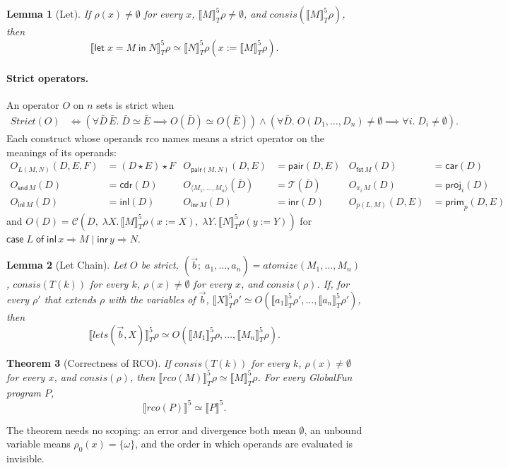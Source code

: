\documentclass[10pt]{article}
\theoremstyle{acmplain}
\newtheorem{theorem}{Theorem}[section]
\newtheorem{lemma}[theorem]{Lemma}
\newcommand{\SEM}[1]{\llbracket #1 \rrbracket}
\newcommand{\key}[1]{\mathsf{#1}}
\newcommand{\pass}[1]{\mathit{#1}}
\newcommand{\Let}{\key{let}\;}
\newcommand{\In}{\;\key{in}\;}
\newcommand{\inl}{\key{inl}\,}
\newcommand{\inr}{\key{inr}\,}
\newcommand{\Case}[5]{\key{case}\;#1\;\key{of}\;\key{inl}\,#2 \Rightarrow #3 \mid \key{inr}\,#4 \Rightarrow #5}
\newcommand{\tuple}[1]{\langle #1 \rangle}
\newcommand{\prj}[1]{\pi_{#1}\,}
\newcommand{\pair}[2]{\key{pair}(#1, #2)}
\newcommand{\FST}{\key{fst}\,}
\newcommand{\SND}{\key{snd}\,}
\newcommand{\prim}[3]{#1(#2, #3)}
\newcommand{\ext}[3]{#1(#2{:=}#3)}
\newcommand{\app}{\star}
\newcommand{\NE}{\neq\emptyset}
\newcommand{\consis}{\mathit{consis}}
\begin{document}
\begin{lemma}[Let]\label{lem:let-beta}
If $\rho(x) \NE$ for every $x$, $\SEM{M}^{\mathrm{5}}_T\rho \NE$, and
$\consis(\SEM{M}^{\mathrm{5}}_T\rho)$, then
\[
  \SEM{\Let x = M \In N}^{\mathrm{5}}_T\rho \simeq
  \SEM{N}^{\mathrm{5}}_T\ext{\rho}{x}{\SEM{M}^{\mathrm{5}}_T\rho} .
\]
\end{lemma}

\paragraph{Strict operators.}
An operator $O$ on $n$ sets is strict when
\begin{align*}
  \mathit{Strict}(O) &\iff
    (\forall \bar{D}\, \bar{E}.\; \bar{D} \simeq \bar{E} \implies O(\bar{D}) \simeq O(\bar{E}))
    \land (\forall \bar{D}.\; O(D_1, \ldots, D_n) \NE \implies \forall i.\; D_i \NE) .
\end{align*}
Each construct whose operands rco names means a strict operator on the
meanings of its operands:
\begin{align*}
  O_{L(M, N)}(D, E, F) &= (D \app E) \app F &
  O_{\pair{M}{N}}(D, E) &= \key{pair}(D, E) &
  O_{\FST M}(D) &= \key{car}(D) \\
  O_{\SND M}(D) &= \key{cdr}(D) &
  O_{\tuple{M_1, \ldots, M_n}}(\bar{D}) &= \mathcal{T}(\bar{D}) &
  O_{\prj{i} M}(D) &= \key{proj}_i(D) \\
  O_{\inl M}(D) &= \key{inl}(D) &
  O_{\inr M}(D) &= \key{inr}(D) &
  O_{\prim{p}{L}{M}}(D, E) &= \key{prim}_p(D, E)
\end{align*}
and $O(D) = \mathcal{C}(D,\; \lambda X.\, \SEM{M}^{\mathrm{5}}_T\ext{\rho}{x}{X},\;
\lambda Y.\, \SEM{N}^{\mathrm{5}}_T\ext{\rho}{y}{Y})$ for
$\Case{L}{x}{M}{y}{N}$.

\begin{lemma}[Let Chain]\label{lem:let-chain}
Let $O$ be strict, $(\vec{b};\; a_1, \ldots, a_n) = \pass{atomize}(M_1, \ldots, M_n)$,
$\consis(T(k))$ for every $k$, $\rho(x) \NE$ for every $x$, and $\consis(\rho)$.
If, for every $\rho'$ that extends
$\rho$ with the variables of $\vec{b}$,
$\SEM{X}^{\mathrm{5}}_T\rho' \simeq O(\SEM{a_1}^{\mathrm{5}}_T\rho', \ldots, \SEM{a_n}^{\mathrm{5}}_T\rho')$, then
\[
  \SEM{\pass{lets}(\vec{b}, X)}^{\mathrm{5}}_T\rho \simeq
  O(\SEM{M_1}^{\mathrm{5}}_T\rho, \ldots, \SEM{M_n}^{\mathrm{5}}_T\rho) .
\]
\end{lemma}

\begin{theorem}[Correctness of RCO]\label{thm:rco}
If $\consis(T(k))$ for every $k$, $\rho(x) \NE$ for every $x$, and $\consis(\rho)$, then
$\SEM{\pass{rco}(M)}^{\mathrm{5}}_T\rho \simeq \SEM{M}^{\mathrm{5}}_T\rho$.
For every GlobalFun program $P$,
\[
  \SEM{\pass{rco}(P)}^{\mathrm{5}} \simeq \SEM{P}^{\mathrm{5}} .
\]
\end{theorem}
The theorem needs no scoping: an error and divergence both mean
$\emptyset$, an unbound variable means $\rho_0(x) = \{\omega\}$, and the
order in which operands are evaluated is invisible.
\end{document}
